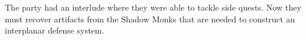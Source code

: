 The party had an interlude where they were able to tackle side quests.
Now they must recover artifacts from the Shadow Monks that are needed to construct an interplanar defense system.

